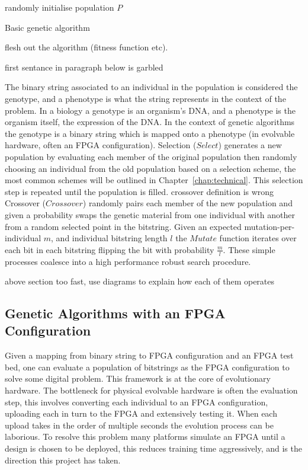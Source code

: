 \begin{algorithm}[t]
	randomly initialise population $P$\;
	\caption{Basic genetic algorithm}
	\label{alg:basic}
\end{algorithm}

\todo flesh out the algorithm (fitness function etc).

\todo first sentance in paragraph below is garbled

The binary string associated to an individual in the
population is considered the genotype, and a phenotype is what the string represents in the
context of the problem. In a biology a genotype is an organism's DNA, and a phenotype is
the organism itself, the expression of the DNA. In the context of genetic algorithms
the genotype is a binary string which is mapped onto a phenotype (in evolvable
hardware, often an FPGA configuration).
Selection ($Select$) generates a new population by evaluating each member of the
original population then
randomly choosing an individual from the old population based on a selection scheme,
the most common schemes will be outlined in Chapter~\ref{chap:technical}.
This selection step is repeated until the population is filled.
\todo crossover definition is wrong
Crossover ($Crossover$) randomly pairs each member of the new population
and given a probability swaps the genetic material from one individual with another from a
random selected point in the bitstring. Given an expected mutation-per-individual $m$, and
individual bitstring length
$l$ the $Mutate$ function iterates over each bit in each bitstring flipping the bit with
probability $\frac{m}{l}$. These simple processes coalesce into a high performance robust search
procedure.

\todo above section too fast, use diagrams to explain how each of them operates

\subsection{Genetic Algorithms with an FPGA Configuration}
Given a mapping from binary string to FPGA configuration and an FPGA test bed, one can
evaluate a population of bitstrings as the FPGA configuration to solve some digital
problem. This framework is at the core of evolutionary hardware. The bottleneck for physical evolvable
hardware is often the evaluation step, this involves converting each individual
to an FPGA configuration, uploading each in turn
to the FPGA and extensively testing it. When each upload takes in the order of
multiple seconds the evolution process can be laborious. To resolve this problem
many platforms simulate an FPGA until a design is chosen to be deployed, this reduces
training time aggressively, and is the direction this project has taken.


